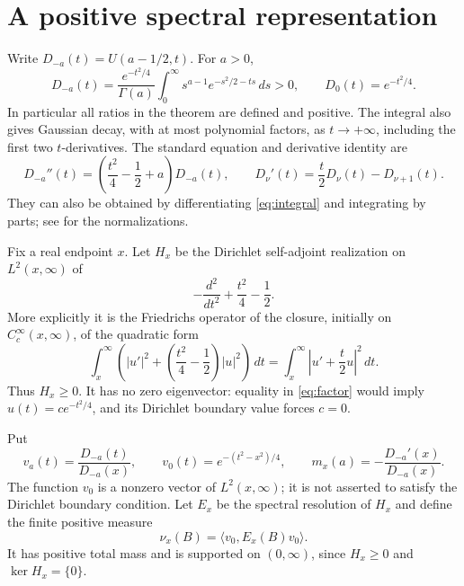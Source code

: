 \documentclass[11pt]{article}
\newcommand{\dd}{\,d}
\begin{document}
\section*{A positive spectral representation}
Write $D_{-a}(t)=U(a-1/2,t)$. For $a>0$,
\begin{equation}\label{eq:integral}
 D_{-a}(t)=\frac{e^{-t^2/4}}{\Gamma(a)}
 \int_0^\infty s^{a-1}e^{-s^2/2-ts}\dd s>0,
 \qquad D_0(t)=e^{-t^2/4}.
\end{equation}
In particular all ratios in the theorem are defined and positive. The
integral also gives Gaussian decay, with at most polynomial factors,
as $t\to+\infty$, including the first two $t$-derivatives. The standard
equation and derivative identity are
\begin{equation}\label{eq:ode}
 D_{-a}''(t)=\left(\frac{t^2}{4}-\frac12+a\right)D_{-a}(t),
 \qquad
 D_\nu'(t)=\frac t2D_\nu(t)-D_{\nu+1}(t).
\end{equation}
They can also be obtained by differentiating \eqref{eq:integral} and
integrating by parts; see \cite{DLMF} for the normalizations.

Fix a real endpoint $x$. Let $H_x$ be the Dirichlet self-adjoint realization
on $L^2(x,\infty)$ of
\[
 -\frac{d^2}{dt^2}+\frac{t^2}{4}-\frac12.
\]
More explicitly it is the Friedrichs operator of the closure, initially on
$C_c^\infty(x,\infty)$, of the quadratic form
\begin{equation}\label{eq:factor}
 \int_x^\infty\left(|u'|^2+
       \left(\frac{t^2}{4}-\frac12\right)|u|^2\right)\dd t
 =\int_x^\infty\left|u'+\frac t2u\right|^2\dd t.
\end{equation}
Thus $H_x\ge0$. It has no zero eigenvector: equality in
\eqref{eq:factor} would imply $u(t)=c e^{-t^2/4}$, and its Dirichlet
boundary value forces $c=0$.

Put
\[
 v_a(t)=\frac{D_{-a}(t)}{D_{-a}(x)},\qquad
 v_0(t)=e^{-(t^2-x^2)/4},\qquad
 m_x(a)=-\frac{D_{-a}'(x)}{D_{-a}(x)}.
\]
The function $v_0$ is a nonzero vector of $L^2(x,\infty)$; it is not
asserted to satisfy the Dirichlet boundary condition. Let $E_x$ be the
spectral resolution of $H_x$ and define the finite positive measure
\[
 \nu_x(B)=\langle v_0,E_x(B)v_0\rangle.
\]
It has positive total mass and is supported on $(0,\infty)$, since
$H_x\ge0$ and $\ker H_x=\{0\}$.
\end{document}
